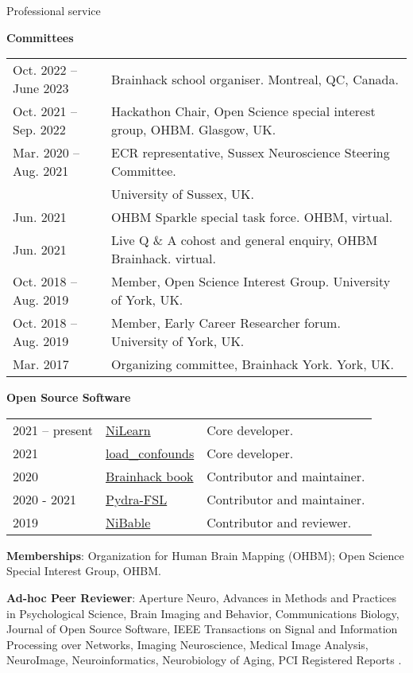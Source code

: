 \documentclass{resume} %
\begin{document}
\begin{rSection}{Professional service}

\textbf{Committees}

\begin{tabular}{@{} l l @{\hspace{6ex}}}
  Oct. 2022 -- June 2023 & Brainhack school organiser. Montreal, QC, Canada. \\
  Oct. 2021 -- Sep. 2022 & Hackathon Chair, Open Science special interest group, OHBM. Glasgow, UK. \\
  Mar. 2020 -- Aug. 2021 & ECR representative, Sussex Neuroscience Steering Committee. \\
   & University of Sussex, UK.\\
  Jun. 2021 & OHBM Sparkle special task force. OHBM, virtual. \\
  Jun. 2021 & Live Q \& A cohost and general enquiry, OHBM Brainhack. virtual. \\
  Oct. 2018 -- Aug. 2019 & Member, Open Science Interest Group. University of York, UK.\\
  Oct. 2018 -- Aug. 2019 & Member, Early Career Researcher forum. University of York, UK.\\
  Mar. 2017 & Organizing committee, Brainhack York. York, UK.\\
\end{tabular}

\textbf{Open Source Software}

\begin{tabular}{@{} l l l @{\hspace{6ex}}}
  2021 -- present & \href{https://github.com/nilearn/nilearn}{NiLearn} & Core developer.\\
  2021 & \href{https://github.com/SIMEXP/load_confounds}{load\_confounds} & Core developer.\\
  2020 & \href{https://github.com/brainhackorg/brainhack_jupyter_book}{Brainhack book} & Contributor and maintainer. \\
  2020 - 2021 & \href{https://github.com/nipype/pydra-fsl}{Pydra-FSL} & Contributor and maintainer. \\
  2019 & \href{https://github.com/nipy/nibabel/pull/793}{NiBable} & Contributor and reviewer.\\
\end{tabular}

\textbf{Memberships}: Organization for Human Brain Mapping (OHBM); Open Science Special Interest Group, OHBM.

\textbf{Ad-hoc Peer Reviewer}: Aperture Neuro,
Advances in Methods and Practices in Psychological Science,
Brain Imaging and Behavior,
Communications Biology,
Journal of Open Source Software,
IEEE Transactions on Signal and Information Processing over Networks,
Imaging Neuroscience,
Medical Image Analysis,
NeuroImage,
Neuroinformatics,
Neurobiology of Aging,
PCI Registered Reports
.
\end{rSection}
\end{document}
